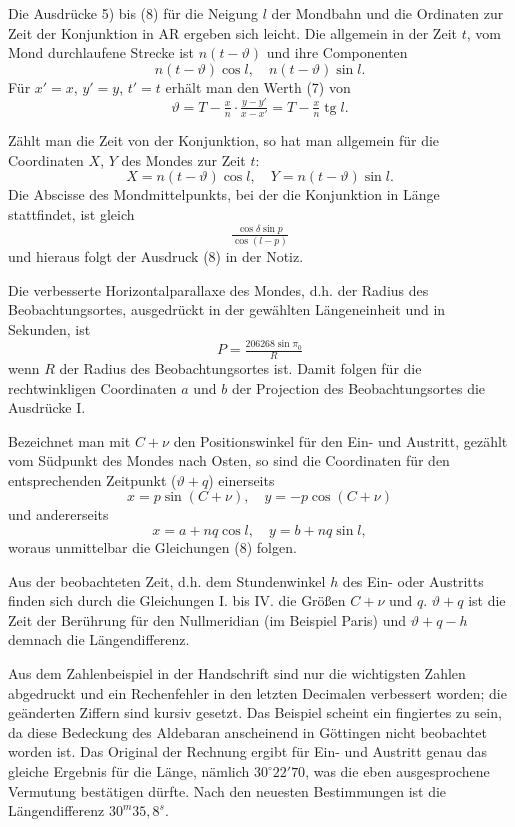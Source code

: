\documentclass[12pt,a4paper]{article}
\theoremstyle{plain}
\theoremstyle{definition}
\theoremstyle{remark}
\DeclareMathOperator{\tg}{tg}
\begin{document}
Die Ausdr\"ucke 5) bis (8) f\"ur die Neigung $l$ der Mondbahn und die Ordinaten zur Zeit der Konjunktion in AR ergeben sich leicht. Die allgemein in der Zeit $t$, vom Mond durchlaufene Strecke ist $n(t-\vartheta)$ und ihre Componenten
\[
n(t-\vartheta)\cos l, \quad n(t-\vartheta)\sin l.
\]
F\"ur $x' = x$, $y' = y$, $t' = t$ erh\"alt man den Werth (7) von
\[
\vartheta = T - \tfrac{x}{n} \cdot \tfrac{y - y'}{x - x'} = T - \tfrac{x}{n}\tg l.
\]

Z\"ahlt man die Zeit von der Konjunktion, so hat man allgemein f\"ur die Coordinaten $X$, $Y$ des Mondes zur Zeit $t$:
\[
X = n(t - \vartheta)\cos l, \quad Y = n(t - \vartheta)\sin l.
\]
Die Abscisse des Mondmittelpunkts, bei der die Konjunktion in L\"ange stattfindet, ist gleich
\[
\tfrac{\cos\delta \sin p}{\cos(l - p)}
\]
und hieraus folgt der Ausdruck (8) in der Notiz.

Die \glqq verbesserte\grqq{} Horizontalparallaxe des Mondes, d.h. der Radius des Beobachtungsortes, ausgedr\"uckt in der gew\"ahlten L\"angeneinheit und in Sekunden, ist
\[
P = \tfrac{206268 \sin\pi_0}{R}
\]
wenn $R$ der Radius des Beobachtungsortes ist. Damit folgen f\"ur die rechtwinkligen Coordinaten $a$ und $b$ der Projection des Beobachtungsortes die Ausdr\"ucke I.

Bezeichnet man mit $C + \nu$ den Positionswinkel f\"ur den Ein- und Austritt, gez\"ahlt vom S\"udpunkt des Mondes nach Osten, so sind die Coordinaten f\"ur den entsprechenden Zeitpunkt ($\vartheta + q$) einerseits
\[
x = p\sin(C + \nu), \quad y = -p\cos(C + \nu)
\]
und andererseits
\[
x = a + nq\cos l, \quad y = b + nq\sin l,
\]
woraus unmittelbar die Gleichungen (8) folgen.

Aus der beobachteten Zeit, d.h. dem Stundenwinkel $h$ des Ein- oder Austritts finden sich durch die Gleichungen I. bis IV. die Gr\"o\ss en $C + \nu$ und $q$. $\vartheta + q$ ist die Zeit der Ber\"uhrung f\"ur den Nullmeridian (im Beispiel Paris) und $\vartheta + q - h$ demnach die L\"angendifferenz.

Aus dem Zahlenbeispiel in der Handschrift sind nur die wichtigsten Zahlen abgedruckt und ein Rechenfehler in den letzten Decimalen verbessert worden; die ge\"anderten Ziffern sind kursiv gesetzt. Das Beispiel scheint ein fingiertes zu sein, da diese Bedeckung des Aldebaran anscheinend in G\"ottingen nicht beobachtet worden ist. Das Original der Rechnung ergibt f\"ur Ein- und Austritt genau das gleiche Ergebnis f\"ur die L\"ange, n\"amlich $30^{\circ}22'70$, was die eben ausgesprochene Vermutung best\"atigen d\"urfte. Nach den neuesten Bestimmungen ist die L\"angendifferenz $30^m35{,}8^s$.
\end{document}
